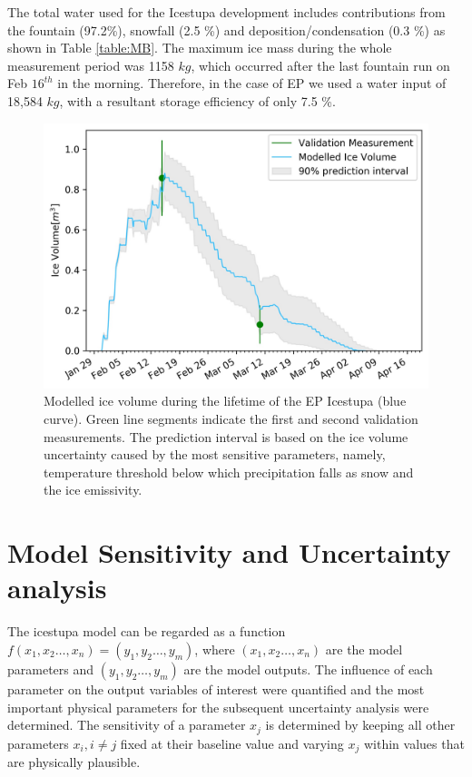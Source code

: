 \documentclass[utf8]{frontiersSCNS} %
\begin{document}
The total water used for the Icestupa development includes contributions from the fountain (97.2\%), snowfall (2.5 \%)
and deposition/condensation (0.3 \%) as shown in Table \ref{table:MB}. The maximum ice mass during the whole
measurement period was 1158 $kg$, which occurred after the last fountain run on Feb $16^{th}$ in the morning.
Therefore, in the case of EP we used a water input of 18,584 $kg$, with a resultant storage efficiency of only
7.5 \%.

  \begin{figure} \begin{center} \includegraphics[width=15 cm]{Figures/Figure_8.jpg} \end{center} \caption{Modelled ice
  volume during the lifetime of the EP Icestupa (blue curve). Green line segments indicate the first and
second validation measurements. The prediction interval is based on the ice volume uncertainty caused by the most
sensitive parameters, namely, temperature threshold below which precipitation falls as snow and the ice emissivity.}
\label{fig:results} \end{figure}
  
\section{Model Sensitivity and Uncertainty analysis}

The icestupa model can be regarded as a function $f(x_1,x_2 \dots, x_n) = (y_1,y_2 \dots, y_m)$, where $(x_1,x_2
\dots, x_n)$ are the model parameters and $(y_1,y_2 \dots, y_m)$ are the model outputs. The influence of each
parameter on the output variables of interest were quantified and the most important physical parameters for the
subsequent uncertainty analysis were determined. The sensitivity of a parameter $x_j$ is determined by keeping all
other parameters $x_i, i \neq j$ fixed at their baseline value and varying $x_j$ within values that are physically
plausible.
\end{document}
